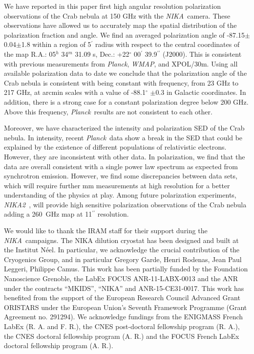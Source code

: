 \documentclass[twocolumn,traditabstract]{aa}
\def\NIKA{\textit{NIKA}}
\def\NIKAd{\textit{NIKA2}}
\def\Planck{\textit{Planck}}
\def\WMAP{\textit{WMAP}}
\begin{document}
We have reported in this paper first high angular resolution polarization observations
of the Crab nebula at 150 GHz with the \NIKA\ camera. These observations have
allowed us to accurately map the spatial distribution of the polarization
fraction and angle.  We find an averaged polarization angle of
-87.15$\pm$0.04$\pm$1.8 within a region of 5$^\prime$ radius with respect to the
central coordinates of the map R.A.: 05$^{h}$ 34$^{m}$ 31.09 s, Dec.:
+22$^{\circ}$ 00$^{\prime}$ 39.9$^{\prime\prime}$ (J2000).  This is consistent with
previous measurements from \Planck, \WMAP, and XPOL/30m.
Using all available polarization data to date we conclude that the
polarization angle of the Crab nebula is consistent with being constant with
frequency, from 23 GHz to 217 GHz, at arcmin scales with a value of
-88.1$^{\circ}$ $\pm$0.3 in Galactic coordinates.
In addition, there is a strong case for a constant polarization degree below 200 GHz. Above this frequency, \Planck\ results are not consistent to each other. 

Moreover, we have characterized the intensity and polarization SED of the Crab nebula. In intensity, recent \Planck\ data show a break in the SED that could be explained by the existence of different populations of relativistic electrons. However, they are inconsistent with other data. In polarization, we find that the data are overall consistent with a single power law spectrum as expected from synchrotron emission. However, we find some discrepancies between data sets, which will require further mm measurements at high resolution for a better understanding of the physics at play. Among future polarization experiments, \NIKAd\ \citep{calvo2016}, will provide high sensitive polarization observations of the Crab nebula adding a 260~GHz map at 11$^{\prime\prime}$ resolution.



\vspace{0.2cm}
 \begin{acknowledgements}
We would like to thank the IRAM staff for their support during the \NIKA\ campaigns. 
The NIKA dilution cryostat has been designed and built at the Institut N\'eel. 
In particular, we acknowledge the crucial contribution of the Cryogenics Group, and 
in particular Gregory Garde, Henri Rodenas, Jean Paul Leggeri, Philippe Camus. 
This work has been partially funded by the Foundation Nanoscience Grenoble, the LabEx FOCUS ANR-11-LABX-0013 and 
the ANR under the contracts ``MKIDS'', ``NIKA'' and ANR-15-CE31-0017. 
This work has benefited from the support of the European Research Council Advanced Grant ORISTARS 
under the European Union's Seventh Framework Programme (Grant Agreement no. 291294).
We acknowledge fundings from the ENIGMASS French LabEx (R. A. and F. R.), 
the CNES post-doctoral fellowship program (R. A.),  the CNES doctoral fellowship program (A. R.) and 
the FOCUS French LabEx doctoral fellowship program (A. R.).
\end{acknowledgements}
\end{document}
